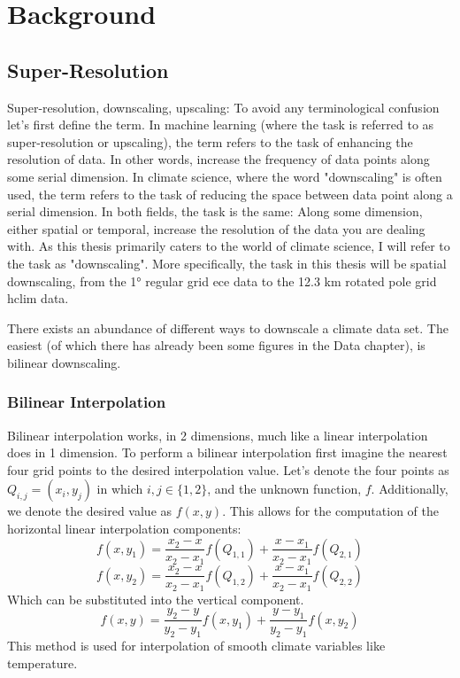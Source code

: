 \chapter{Background}

\section{Super-Resolution}

Super-resolution, \gls{downscaling}, upscaling: To avoid any terminological confusion let's first define the term. In machine learning (where the task is referred to as super-resolution or upscaling), the term refers to the task of enhancing the resolution of data. In other words, increase the frequency of data points along some serial dimension. In climate science, where the word "\gls{downscaling}" is often used, the term refers to the task of reducing the space between data point along a serial dimension. In both fields, the task is the same: Along some dimension, either spatial or temporal, increase the resolution of the data you are dealing with. As this thesis primarily caters to the world of climate science, I will refer to the task as "\gls{downscaling}".
More specifically, the task in this thesis will be spatial \gls{downscaling}, from the 1° regular grid \gls{ece} data to the 12.3 km rotated pole grid \gls{hclim} data. 

There exists an abundance of different ways to downscale a climate data set. The easiest (of which there has already been some figures in the Data chapter), is bilinear downscaling.

\subsection{Bilinear Interpolation}

Bilinear interpolation works, in 2 dimensions, much like a linear interpolation does in 1 dimension. To perform a bilinear interpolation first imagine the nearest four grid points to the desired interpolation value. Let's denote the four points as $Q_{i,j} = (x_i, y_j)$ in which $i, j \in \{1,2\}$, and the unknown function, $f$. Additionally, we denote the desired value as $f(x, y)$. This allows for the computation of the horizontal linear interpolation components: 
\begin{equation}
    f(x,y_1) = \frac{x_2 - x}{x_2 - x_1}f(Q_{1,1}) + \frac{x - x_1}{x_2 - x_1}f(Q_{2,1})
\end{equation}
\begin{equation}
    f(x,y_2) = \frac{x_2 - x}{x_2 - x_1}f(Q_{1,2}) + \frac{x - x_1}{x_2 - x_1}f(Q_{2,2})
\end{equation}
Which can be substituted into the vertical component.
\begin{equation}
    f(x,y) = \frac{y_2 - y}{y_2 - y_1}f(x,y_1) + \frac{y - y_1}{y_2 - y_1}f(x,y_2)
\end{equation}
This method is used for interpolation of smooth climate variables like temperature.

